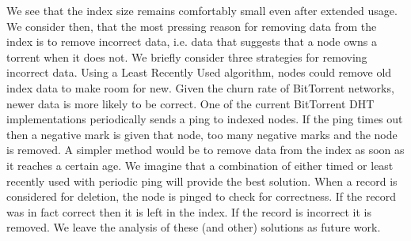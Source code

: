    We see that the index size remains comfortably small even after extended usage. We consider then, that the most pressing reason for removing data from the index is to remove incorrect data, i.e. data that suggests that a node owns a torrent when it does not. We briefly consider three strategies for removing incorrect data. Using a Least Recently Used algorithm, nodes could remove old index data to make room for new. Given the churn rate of BitTorrent networks, newer data is more likely to be correct. One of the current BitTorrent DHT implementations periodically sends a ping to indexed nodes. If the ping times out then a negative mark is given that node, too many negative marks and the node is removed. A simpler method would be to remove data from the index as soon as it reaches a certain age. We imagine that a combination of either timed or least recently used with periodic ping will provide the best solution. When a record is considered for deletion, the node is pinged to check for correctness. If the record was in fact correct then it is left in the index. If the record is incorrect it is removed. We leave the analysis of these (and other) solutions as future work.